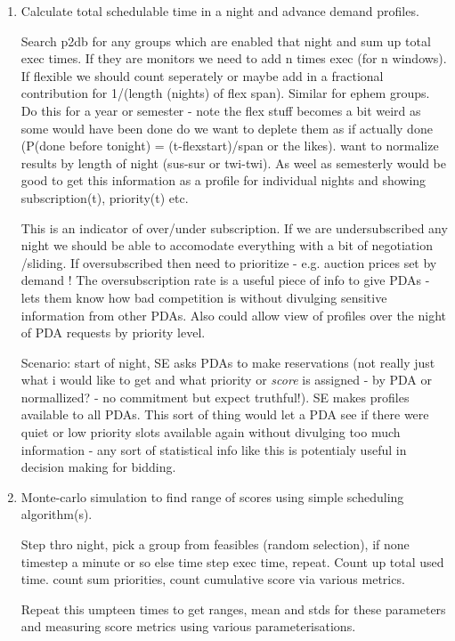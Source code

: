 \begin{enumerate}

\item Calculate total schedulable time in a night and advance demand profiles.

Search p2db for any groups which are enabled that night and sum up total exec times. If they are monitors we need to add n times exec (for n windows). If flexible we should count seperately or maybe add in a fractional contribution for 1/(length (nights) of flex span). Similar for ephem groups. Do this for a year or semester - note the flex stuff becomes a bit weird as some would have been done do we want to deplete them as if actually done (P(done before tonight) = (t-flexstart)/span or the likes). want to normalize results by length of night (sus-sur or twi-twi). As weel as semesterly would be good to get this information as a profile for individual nights and showing subscription(t), priority(t) etc.

This is an indicator of over/under subscription. If we are undersubscribed any night we should be able to accomodate everything with a bit of negotiation /sliding. If oversubscribed then need to prioritize - e.g. auction prices set by demand ! The oversubscription rate is a useful piece of info to give PDAs - lets them know how bad competition is without divulging sensitive information from other PDAs. Also could allow view of profiles over the night of PDA requests by priority level. 

Scenario: start of night, SE asks PDAs to make reservations (not really just what i would like to get and what priority or \emph{score} is assigned  - by PDA or normallized? - no commitment but expect truthful!). SE makes profiles available to all PDAs. This sort of thing would let a PDA see if there were quiet or low priority slots available again without divulging too much information - any sort of statistical info like this is potentialy useful in decision making for bidding. 


\item Monte-carlo simulation to find range of scores using simple scheduling algorithm(s).

Step thro night, pick a group from feasibles (random selection), if none timestep a minute or so else time step exec time, repeat.
Count up total used time. count sum priorities, count cumulative score via various metrics.

Repeat this umpteen times to get ranges, mean and stds for these parameters and measuring score metrics using various parameterisations.


\end{enumerate}
